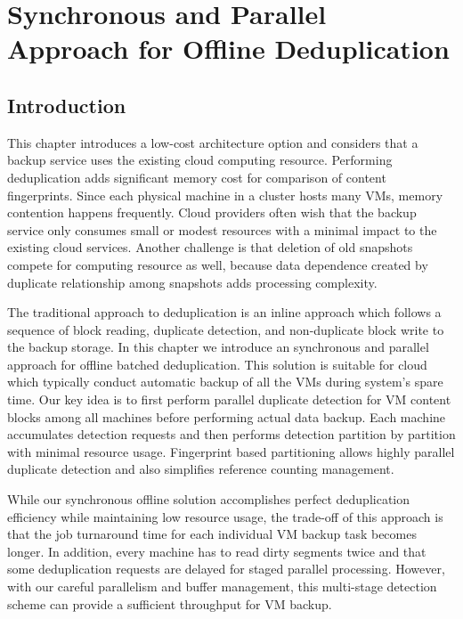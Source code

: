 \chapter{Synchronous and Parallel Approach for Offline Deduplication}
\label{chap:offline}
\section{Introduction}
\label{offline:intro}
This chapter introduces a low-cost architecture option and considers that
a backup service uses the existing cloud computing resource.
Performing deduplication adds significant  memory cost for comparison of content fingerprints. 
Since each physical machine in a cluster  hosts many VMs, memory contention happens frequently. 
Cloud providers often wish that the backup service only consumes  small or modest resources 
with a minimal impact to the existing cloud services.  Another challenge is 
that deletion of old snapshots compete for computing resource as well, because data dependence created 
by duplicate relationship among snapshots  adds processing complexity.

The traditional approach to deduplication is an inline approach which follows
a sequence of block reading, duplicate detection,  and non-duplicate  block write to the 
backup storage. In this chapter we introduce an synchronous and parallel approach
for offline batched deduplication. This solution is suitable for cloud which typically conduct
automatic backup of all the VMs during system's spare time.
Our key idea  is to  first perform parallel duplicate detection for VM content blocks 
among all machines before performing actual data backup. Each machine
accumulates detection requests and  then performs detection   partition by partition 
with minimal resource usage.
Fingerprint based partitioning allows highly parallel duplicate detection  and also simplifies 
reference counting management.  

While our synchronous offline solution accomplishes perfect deduplication efficiency while maintaining
low resource usage,
the trade-off of this approach is that the job turnaround time for each individual
VM backup task becomes longer. In addition,
every machine has to read dirty segments twice
and that some deduplication requests are delayed for staged parallel processing.
However, with our careful parallelism and buffer management,
this multi-stage detection scheme can provide a sufficient throughput for VM backup.

